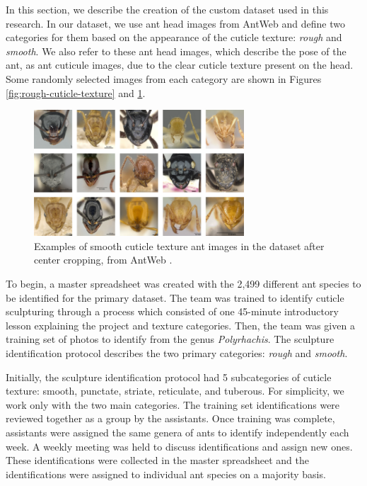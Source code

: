 \documentclass{aci}
\numberwithin{equation}{section}
\begin{document}
In this section, we describe the creation of the custom dataset used in this
research. In our dataset, we use ant head images from AntWeb
\cite{perrichot_antweb_2012} and define two categories for them based on the
appearance of the cuticle texture: \textit{rough} and \textit{smooth}. We also
refer to these ant head images, which describe the pose of the ant, as ant
cuticule images, due to the clear cuticle texture present on the head. Some
randomly selected images from each category are shown in Figures
\ref{fig:rough-cuticle-texture} and \ref{fig:smooth-cuticle-texture}.

\begin{figure}
    \centering
    \includegraphics[width=0.7\textwidth]{assets/images/smooth_full_collage.png}
    \caption{Examples of smooth cuticle texture ant images in the dataset after
        center cropping, from AntWeb \cite{perrichot_antweb_2012}.}
    \label{fig:smooth-cuticle-texture}
\end{figure}

To begin, a master spreadsheet was created with the 2,499 different ant species
to be identified for the primary dataset. The team was trained to identify
cuticle sculpturing through a process which consisted of one 45-minute
introductory lesson explaining the project and texture categories. Then, the
team was given a training set of photos to identify from the genus
\textit{Polyrhachis}. The sculpture identification protocol describes the two
primary categories: \textit{rough} and \textit{smooth}.

Initially, the sculpture identification protocol had 5 subcategories of cuticle
texture: smooth, punctate, striate, reticulate, and tuberous. For simplicity, we
work only with the two main categories. The training set identifications were
reviewed together as a group by the assistants. Once training was complete,
assistants were assigned the same genera of ants to identify independently each
week. A weekly meeting was held to discuss identifications and assign new ones.
These identifications were collected in the master spreadsheet and the
identifications were assigned to individual ant species on a majority basis.
\end{document}
